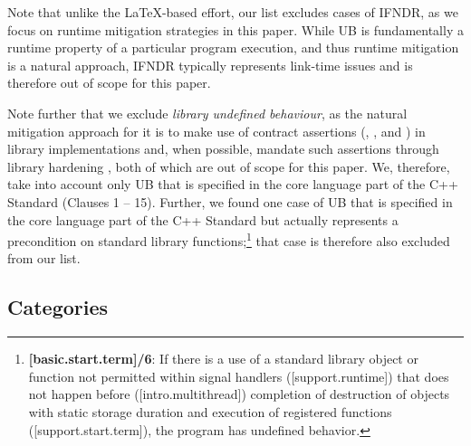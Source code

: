 Note that unlike the \LaTeX-based effort, our list excludes cases of IFNDR, as we focus on runtime mitigation strategies in this paper. While UB is fundamentally a runtime property of a particular program execution, and thus runtime mitigation is a natural approach, IFNDR typically represents link-time issues and is therefore out of scope for this paper.

Note further that we exclude \emph{library undefined behaviour}, as the natural mitigation approach for it is to make use of contract assertions (, , and ) in library implementations and, when possible, mandate such assertions through library hardening \cite{P3471R4}, both of which are out of scope for this paper. We, therefore, take into account only UB that is specified in the core language part of the C++ Standard (Clauses 1 -- 15). Further, we found one case of UB that is specified in the core language part of the C++ Standard but actually represents a precondition on standard library functions;\footnote{\textbf{[basic.start.term]/6}: If there is a use of a standard library object or function not permitted within signal handlers ([support.runtime]) that does not happen before ([intro.multithread]) completion of destruction of objects with static storage duration and execution of  registered functions ([support.start.term]), the program has undefined behavior.}
that case is therefore also excluded from our list.

\subsection{Categories}
\label{categories}

